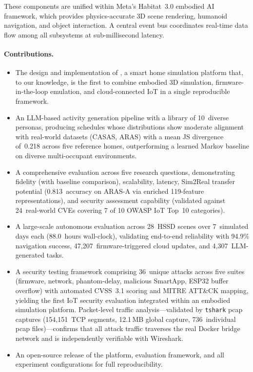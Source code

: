 These components are unified within Meta's Habitat~3.0 embodied AI
framework, which provides physics-accurate 3D scene rendering,
humanoid navigation, and object interaction.  A central event bus
coordinates real-time data flow among all subsystems at
sub-millisecond latency.

\paragraph{Contributions.}
\begin{itemize}[leftmargin=*]
  \item The design and implementation of \sys{}, a smart home
    simulation platform that, to our knowledge, is the first to
    combine embodied 3D simulation, firmware-in-the-loop emulation,
    and cloud-connected IoT in a single reproducible framework.
  \item An LLM-based activity generation pipeline with a library of
    10~diverse personas, producing schedules whose distributions
    show moderate alignment with real-world datasets (CASAS, ARAS)
    with a mean JS divergence of~0.218 across five reference homes,
    outperforming a learned Markov baseline on diverse multi-occupant
    environments.
  \item A comprehensive evaluation across five research questions,
    demonstrating fidelity (with baseline comparison), scalability,
    latency, Sim2Real transfer potential (0.813~accuracy on ARAS-A
    via enriched 119-feature representations), and security
    assessment capability (validated against 24~real-world CVEs
    covering 7 of 10 OWASP IoT Top~10 categories).
  \item A large-scale autonomous evaluation across 28~HSSD scenes
    over 7~simulated days each (88.0~hours wall-clock), validating
    end-to-end reliability with 94.9\% navigation success,
    47{,}207~firmware-triggered cloud updates, and
    4{,}307~LLM-generated tasks.
  \item A security testing framework comprising 36~unique attacks
    across five suites (firmware, network, phantom-delay, malicious
    SmartApp, ESP32 buffer overflow) with automated CVSS~3.1 scoring
    and MITRE ATT\&CK mapping, yielding the first IoT security
    evaluation integrated within an embodied simulation platform.
    Packet-level traffic analysis---validated by \texttt{tshark}
    pcap captures (154{,}151~TCP segments, 12.1\,MB global capture,
    736~individual pcap files)---confirms that all attack traffic
    traverses the real Docker bridge network and is independently
    verifiable with Wireshark.
  \item An open-source release of the platform, evaluation framework,
    and all experiment configurations for full reproducibility.
\end{itemize}
